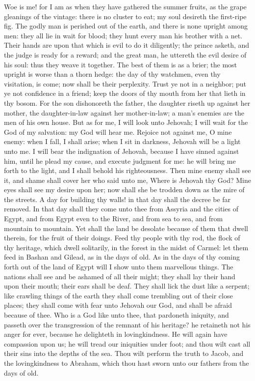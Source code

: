 Woe is me! for I am as when they have gathered the summer fruits, as the grape gleanings of the vintage: there is no cluster to eat; my soul desireth the first-ripe fig. The godly man is perished out of the earth, and there is none upright among men: they all lie in wait for blood; they hunt every man his brother with a net. Their hands are upon that which is evil to do it diligently; the prince asketh, and the judge is ready for a reward; and the great man, he uttereth the evil desire of his soul: thus they weave it together. The best of them is as a brier; the most upright is worse than a thorn hedge: the day of thy watchmen, even thy visitation, is come; now shall be their perplexity. Trust ye not in a neighbor; put ye not confidence in a friend; keep the doors of thy mouth from her that lieth in thy bosom. For the son dishonoreth the father, the daughter riseth up against her mother, the daughter-in-law against her mother-in-law; a man’s enemies are the men of his own house.  But as for me, I will look unto Jehovah; I will wait for the God of my salvation: my God will hear me. Rejoice not against me, O mine enemy: when I fall, I shall arise; when I sit in darkness, Jehovah will be a light unto me. I will bear the indignation of Jehovah, because I have sinned against him, until he plead my cause, and execute judgment for me: he will bring me forth to the light, and I shall behold his righteousness. Then mine enemy shall see it, and shame shall cover her who said unto me, Where is Jehovah thy God? Mine eyes shall see my desire upon her; now shall she be trodden down as the mire of the streets. A day for building thy walls! in that day shall the decree be far removed. In that day shall they come unto thee from Assyria and the cities of Egypt, and from Egypt even to the River, and from sea to sea, and from mountain to mountain. Yet shall the land be desolate because of them that dwell therein, for the fruit of their doings.  Feed thy people with thy rod, the flock of thy heritage, which dwell solitarily, in the forest in the midst of Carmel: let them feed in Bashan and Gilead, as in the days of old. As in the days of thy coming forth out of the land of Egypt will I show unto them marvellous things. The nations shall see and be ashamed of all their might; they shall lay their hand upon their mouth; their ears shall be deaf. They shall lick the dust like a serpent; like crawling things of the earth they shall come trembling out of their close places; they shall come with fear unto Jehovah our God, and shall be afraid because of thee.  Who is a God like unto thee, that pardoneth iniquity, and passeth over the transgression of the remnant of his heritage? he retaineth not his anger for ever, because he delighteth in lovingkindness. He will again have compassion upon us; he will tread our iniquities under foot; and thou wilt cast all their sins into the depths of the sea. Thou wilt perform the truth to Jacob, and the lovingkindness to Abraham, which thou hast sworn unto our fathers from the days of old. 
